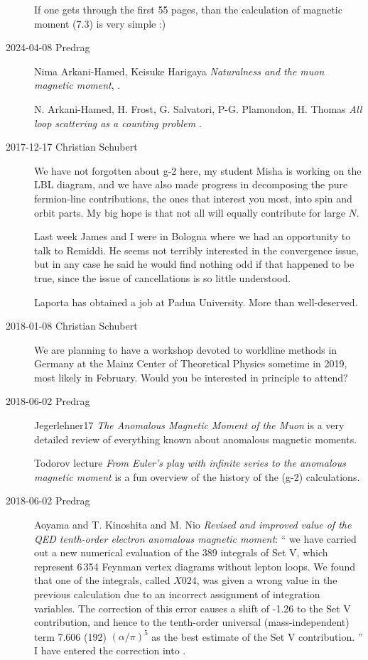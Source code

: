 \begin{description}
If one gets through the first 55 pages, than the calculation of magnetic
moment (7.3) is very simple :)

\item[2024-04-08 Predrag]
Nima Arkani-Hamed, Keisuke Harigaya
{\em Naturalness and the muon magnetic moment}, .


N. Arkani-Hamed, H. Frost, G. Salvatori, P-G. Plamondon, H. Thomas
{\em All loop scattering as a counting problem} 
.


 

\item[2017-12-17 Christian Schubert]
We have not forgotten about g-2 here, my student Misha is working on the
LBL diagram, and we have also made progress in decomposing the pure
fermion-line contributions, the ones that interest you most, into spin
and orbit parts. My big hope is that not all will equally contribute for
large $N$.

Last week James and I were in Bologna where we had an opportunity to talk
to Remiddi. He seems not terribly interested in the convergence issue,
but in any case he said he would find nothing odd if that happened to be
true, since the issue of cancellations is so little understood.

Laporta has obtained a job at Padua University. More than well-deserved.

\item[2018-01-08 Christian Schubert]
We are planning to have a workshop devoted to worldline methods in
Germany at the Mainz Center of Theoretical Physics sometime in 2019, most
likely in February. Would you be interested in principle to attend?

\item[2018-06-02 Predrag]
Jegerlehner17
{\em The Anomalous Magnetic Moment of the Muon}
is a very detailed review of everything known about anomalous
magnetic moments.

Todorov lecture {\em From {Euler}'s play with infinite series to
the anomalous magnetic moment} is a fun overview of the history of the (g-2)
calculations.

\item[2018-06-02 Predrag]
Aoyama and T. Kinoshita and M. Nio {\em Revised and improved value
of the {QED} tenth-order electron anomalous magnetic moment}:
``
we have carried out a new numerical evaluation of the 389 integrals of Set V,
which represent 6\,354 Feynman vertex diagrams without lepton loops. We found
that one of the integrals, called $X024$, was given a wrong value in the
previous calculation due to an incorrect assignment of integration variables.
The correction of this error causes a shift of -1.26 to the Set V contribution,
and hence to the tenth-order universal (mass-independent) term 7.606
(192) $(\alpha/{\pi})^5$ as the best estimate of the Set V contribution.
''
I have entered the correction into .


\end{description}
